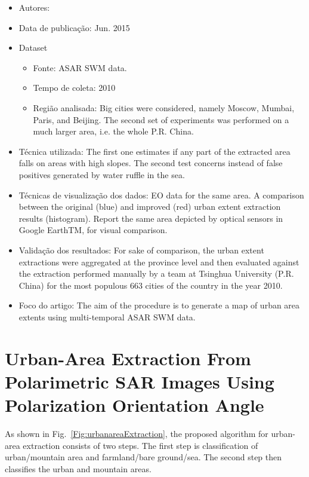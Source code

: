 \documentclass[paper=a4, fontsize=11pt]{scrartcl}
\begin{document}
\begin{itemize}
    \item Autores:~\cite{lisini2015improved}
    \item Data de publicação: Jun. 2015
    \item Dataset
    \begin{itemize}
        \item Fonte: ASAR SWM data.
        \item Tempo de coleta: 2010
        \item Região analisada: Big cities were considered, namely Moscow, Mumbai, Paris, and Beijing. The second set of experiments was performed on a much larger area, i.e. the whole P.R. China.
    \end{itemize}
    \item Técnica utilizada: The first one estimates if any part of the extracted area falls on areas with high slopes. The second test concerns instead of false positives generated by water ruffle in the sea. 
    \item Técnicas de visualização dos dados: EO data for the same area. A comparison between the original (blue) and improved (red) urban extent extraction results (histogram). Report the same area depicted by optical sensors in Google EarthTM, for visual comparison.
    \item Validação dos resultados: For sake of comparison, the urban extent extractions were aggregated at the province level and then evaluated against the extraction performed manually by a team at Tsinghua University (P.R. China) for the most populous 663 cities of the country in the year 2010.
    \item Foco do artigo: The aim of the procedure is to generate a map of urban area extents using multi-temporal ASAR SWM data.
\end{itemize}

\newpage

\section*{Urban-Area Extraction From Polarimetric SAR Images Using Polarization Orientation Angle}

As shown in Fig.~\ref{Fig:urbanareaExtraction}, the proposed algorithm for urban-area extraction consists of two steps. 
The first step is classification of urban/mountain area and farmland/bare ground/sea. The second step then classifies the urban and mountain areas.
\end{document}
